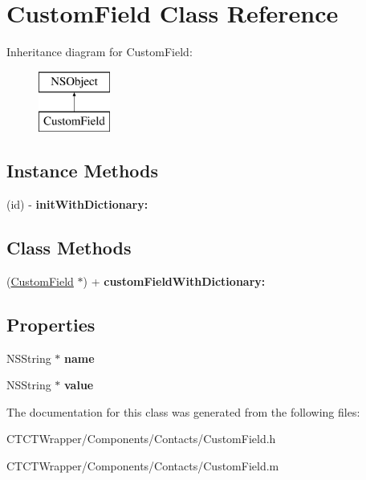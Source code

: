 \hypertarget{interface_custom_field}{\section{Custom\-Field Class Reference}
\label{interface_custom_field}
}
Inheritance diagram for Custom\-Field\-:\begin{figure}[H]
\begin{center}
\leavevmode
\includegraphics[height=2.000000cm]{interface_custom_field}
\end{center}
\end{figure}
\subsection*{Instance Methods}
\begin{DoxyCompactItemize}
\item 
\hypertarget{interface_custom_field_a7626174a904b8bb2ffb0a1f3335e11f3}{(id) -\/ {\bfseries init\-With\-Dictionary\-:}}\label{interface_custom_field_a7626174a904b8bb2ffb0a1f3335e11f3}

\end{DoxyCompactItemize}
\subsection*{Class Methods}
\begin{DoxyCompactItemize}
\item 
\hypertarget{interface_custom_field_a4d084b31194eebab5d4ec5a8e40fc854}{(\hyperlink{interface_custom_field}{Custom\-Field} $\ast$) + {\bfseries custom\-Field\-With\-Dictionary\-:}}\label{interface_custom_field_a4d084b31194eebab5d4ec5a8e40fc854}

\end{DoxyCompactItemize}
\subsection*{Properties}
\begin{DoxyCompactItemize}
\item 
\hypertarget{interface_custom_field_a1814194d29f8a3be86cc84eced716cf3}{N\-S\-String $\ast$ {\bfseries name}}\label{interface_custom_field_a1814194d29f8a3be86cc84eced716cf3}

\item 
\hypertarget{interface_custom_field_a13d5a49c45fb733b3784ecc2fb53f643}{N\-S\-String $\ast$ {\bfseries value}}\label{interface_custom_field_a13d5a49c45fb733b3784ecc2fb53f643}

\end{DoxyCompactItemize}


The documentation for this class was generated from the following files\-:\begin{DoxyCompactItemize}
\item 
C\-T\-C\-T\-Wrapper/\-Components/\-Contacts/Custom\-Field.\-h\item 
C\-T\-C\-T\-Wrapper/\-Components/\-Contacts/Custom\-Field.\-m\end{DoxyCompactItemize}
